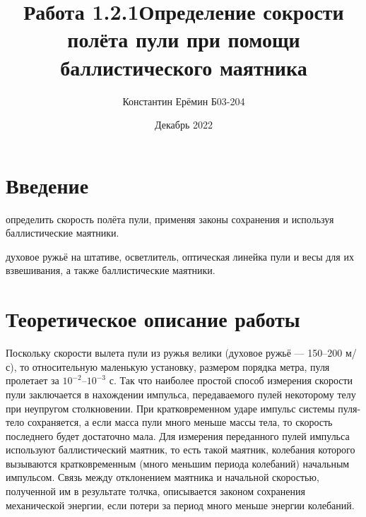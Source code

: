 

\title{\textbf{Работа 1.2.1}\linebreak Определение сокрости полёта пули при помощи баллистического маятника}
\author{Константин Ерёмин Б03-204}
\date{Декабрь 2022}


    \maketitle

    \section{Введение}
        \begin{target}
            определить скорость полёта пули, применяя законы сохранения и используя баллистические маятники.
        \end{target}

        \begin{setting}
            духовое ружьё на штативе, осветлитель, оптическая линейка пули и весы для их взвешивания, а также баллистические маятники.
        \end{setting}

    \section{Теоретическое описание работы}
        Поскольку скорости вылета пули из ружья велики (духовое ружьё --- 150--200 м/с), то относительную маленькую установку, размером порядка метра, пуля пролетает за $10^{-2}$--$10^{-3}$ с. Так что наиболее простой способ измерения скорости пули заключается в нахождении импульса, передаваемого пулей некоторому телу при неупругом столкновении. При кратковременном ударе импульс системы пуля-тело сохраняется, а если масса пули много меньше массы тела, то скорость последнего будет достаточно мала.
        Для измерения переданного пулей импульса используют баллистический маятник, то есть такой маятник, колебания которого вызываются кратковременным (много меньшим периода колебаний) начальным импульсом. Связь между отклонением маятника и начальной скоростью, полученной им в результате толчка, описывается законом сохранения механической энергии, если потери за период много меньше энергии колебаний.

